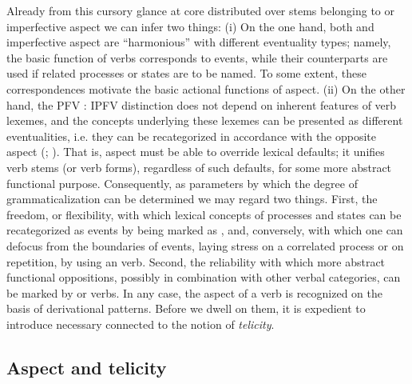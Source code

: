 \documentclass[output=paper]{langsci/langscibook}
\begin{document}
Already from this cursory glance at core  distributed over stems belonging to  or imperfective aspect we can infer two things: (i) On the one hand, both  and imperfective aspect are “harmonious” with different eventuality types; namely, the basic function of  verbs corresponds to events, while their  counterparts are used if related processes or states are to be named. To some extent, these correspondences motivate the basic actional functions of aspect. (ii) On the other hand, the PFV : IPFV distinction does not depend on inherent features of verb lexemes, and the concepts underlying these lexemes can be presented as different eventualities, i.e. they can be recategorized in accordance with the opposite aspect (\citealt[289--294]{Mende1999}; \citealt[174--177]{Lehmann2004grammatication}). That is, aspect must be able to override lexical defaults; it unifies verb stems (or verb forms), regardless of such defaults, for some more abstract functional purpose. Consequently, as parameters by which the degree of grammaticalization can be determined we may regard two things. First, the freedom, or flexibility, with which lexical concepts of processes and states can be recategorized as events by being marked as , and, conversely, with which one can defocus from the boundaries of events, laying stress on a correlated process or on repetition, by using an  verb. Second, the reliability with which more abstract functional oppositions, possibly in combination with other verbal categories, can be marked by  or  verbs. In any case, the aspect of a verb is recognized on the basis of derivational patterns. Before we dwell on them, it is expedient to introduce necessary  connected to the notion of \textit{telicity}.


\subsection{Aspect and telicity}\label{sec:wiemerserzant:2.3}
\end{document}
